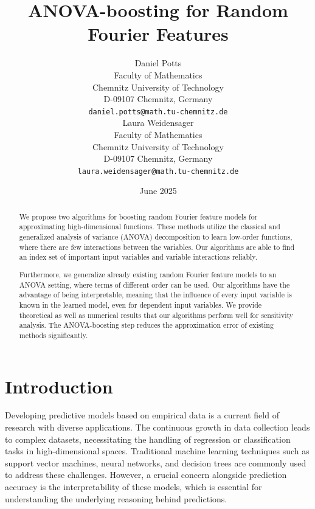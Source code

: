 \documentclass{article}
\title{ANOVA-boosting for Random Fourier Features}
\date{June 2025}	%
\author{ Daniel Potts \\
	Faculty of Mathematics\\
	Chemnitz University of Technology\\
	D-09107 Chemnitz, Germany \\
	\texttt{daniel.potts@math.tu-chemnitz.de} \\
	\And
	Laura Weidensager \\
	Faculty of Mathematics\\
	Chemnitz University of Technology\\
	D-09107 Chemnitz, Germany \\
	\texttt{laura.weidensager@math.tu-chemnitz.de} \\
}
\theoremstyle{definition}
\numberwithin{equation}{section}
\begin{document}
\maketitle

\begin{abstract}
We propose two algorithms for boosting random Fourier feature models for approximating high-dimensional
functions. These methods utilize the classical and generalized analysis of variance (ANOVA) decomposition
to learn low-order functions, where there are few interactions between the variables. Our algorithms are 
able to find an index set of important input variables and variable interactions reliably.\par
Furthermore, we generalize already existing random Fourier feature models to an ANOVA setting, where terms of different order can be used.
Our algorithms have the advantage of being interpretable, meaning that the influence of every input variable is known in the learned model, even for dependent input variables.  
We provide theoretical as well as numerical results that our algorithms perform well for sensitivity analysis. The ANOVA-boosting step reduces the approximation error of existing methods significantly.
\end{abstract}




\section{Introduction}
Developing predictive models based on empirical data is a current field of research with diverse applications. 
The continuous growth in data collection leads to complex datasets, necessitating the handling of regression or 
classification tasks in high-dimensional spaces. Traditional machine learning techniques such as support vector 
machines, neural networks, and decision trees are commonly used to address these challenges. However, a crucial 
concern alongside prediction accuracy is the interpretability of these models, which is essential for understanding 
the underlying reasoning behind predictions. \par
\end{document}
